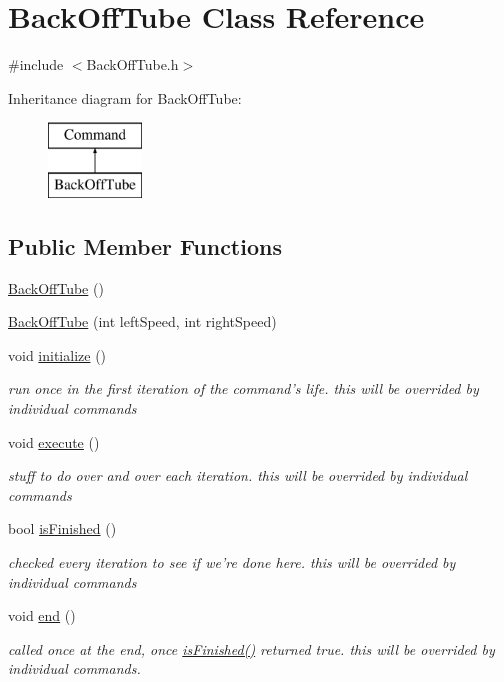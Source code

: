 \hypertarget{classBackOffTube}{\section{Back\-Off\-Tube Class Reference}
\label{classBackOffTube}
}


{\ttfamily \#include $<$Back\-Off\-Tube.\-h$>$}

Inheritance diagram for Back\-Off\-Tube\-:\begin{figure}[H]
\begin{center}
\leavevmode
\includegraphics[height=2.000000cm]{classBackOffTube}
\end{center}
\end{figure}
\subsection*{Public Member Functions}
\begin{DoxyCompactItemize}
\item 
\hyperlink{classBackOffTube_ab8fb886043a6df04258ac22415b543dd}{Back\-Off\-Tube} ()
\item 
\hyperlink{classBackOffTube_a6fedeb5bfc92b531a300ce2d95a1a3bb}{Back\-Off\-Tube} (int left\-Speed, int right\-Speed)
\item 
void \hyperlink{classBackOffTube_a16b83364009db3cb58ec6c09458a8741}{initialize} ()
\begin{DoxyCompactList}\small\item\em run once in the first iteration of the command's life. this will be overrided by individual commands \end{DoxyCompactList}\item 
void \hyperlink{classBackOffTube_a9d40125cdd95f7ca2db13a5d48e91a93}{execute} ()
\begin{DoxyCompactList}\small\item\em stuff to do over and over each iteration. this will be overrided by individual commands \end{DoxyCompactList}\item 
bool \hyperlink{classBackOffTube_abda2334a9432829830a51195a9cce4e6}{is\-Finished} ()
\begin{DoxyCompactList}\small\item\em checked every iteration to see if we're done here. this will be overrided by individual commands \end{DoxyCompactList}\item 
void \hyperlink{classBackOffTube_a6753fa3b5148d3b8cc06b8e2f7f02be7}{end} ()
\begin{DoxyCompactList}\small\item\em called once at the end, once \hyperlink{classBackOffTube_abda2334a9432829830a51195a9cce4e6}{is\-Finished()} returned true. this will be overrided by individual commands. \end{DoxyCompactList}\end{DoxyCompactItemize}
